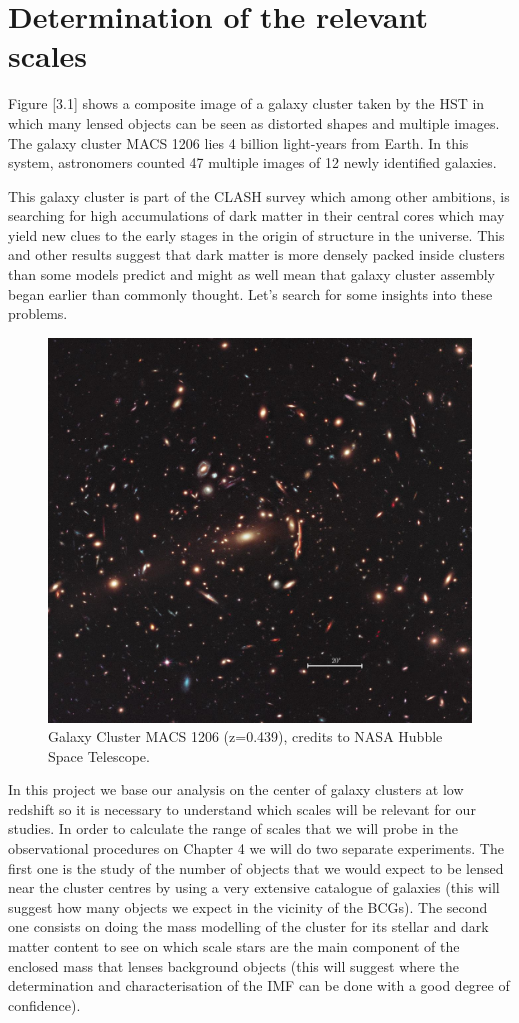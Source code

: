 \chapter{Determination of the relevant scales}

Figure [3.1] shows a composite image of a galaxy cluster taken by the HST in which many lensed objects can be seen as distorted shapes and multiple images. The galaxy cluster MACS 1206 lies 4 billion light-years from Earth. In this system, astronomers counted 47 multiple images of 12 newly identified galaxies. 

This galaxy cluster is part of the CLASH survey which among other ambitions, is searching for high accumulations of dark matter in their central cores which may yield new clues to the early stages in the origin of structure in the universe. This and other results suggest that dark matter is more densely packed inside clusters than some models predict and might as well mean that galaxy cluster assembly began earlier than commonly thought. Let's search for some insights into these problems.

\begin{figure}[H]
\centering
\includegraphics[width=12cm]{images/GC.jpg}
\caption[Galaxy Cluster MACS 1206]{Galaxy Cluster MACS 1206 (z=0.439), credits to NASA Hubble Space Telescope.}
\end{figure}

In this project we base our analysis on the center of galaxy clusters at low redshift so it is necessary to understand which scales will be relevant for our studies. In order to calculate the range of scales that we will probe in the observational procedures on Chapter 4 we will do two separate experiments. The first one is the study of the number of objects that we would expect to be lensed near the cluster centres by using a very extensive catalogue of galaxies (this will suggest how many objects we expect in the vicinity of the BCGs). The second one consists on doing the mass modelling of the cluster for its stellar and dark matter content to see on which scale stars are the main component of the enclosed mass that lenses background objects (this will suggest where the determination and characterisation of the IMF can be done with a good degree of confidence).

